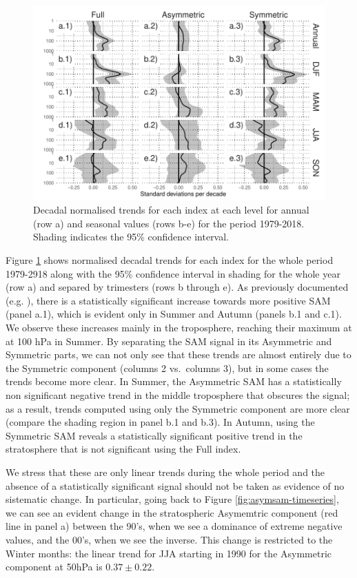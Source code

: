 \documentclass[]{ametsocV5}
\begin{document}
\begin{figure}
\includegraphics{trends-1} \caption[Decadal normalised trends for each index at each level for annual (row a) and seasonal values (rows b-e) for the period 1979-2018]{Decadal normalised trends for each index at each level for annual (row a) and seasonal values (rows b-e) for the period 1979-2018. Shading indicates the 95\% confidence interval.}\label{fig:trends}
\end{figure}

Figure \ref{fig:trends} shows normalised decadal trends for each index
for the whole period 1979-2918 along with the 95\% confidence interval
in shading for the whole year (row a) and separed by trimesters (rows b
through e). As previously documented (e.g. \citet{fogt2020}), there is a
statistically significant increase towards more positive SAM (panel
a.1), which is evident only in Summer and Autumn (panels b.1 and c.1).
We observe these increases mainly in the troposphere, reaching their
maximum at at 100 hPa in Summer. By separating the SAM signal in its
Asymmetric and Symmetric parts, we can not only see that these trends
are almost entirely due to the Symmetric component (columns 2
vs.~columns 3), but in some cases the trends become more clear. In
Summer, the Asymmetric SAM has a statistically non significant negative
trend in the middle troposphere that obscures the signal; as a result,
trends computed using only the Symmetric component are more clear
(compare the shading region in panel b.1 and b.3). In Autumn, using the
Symmetric SAM reveals a statistically significant positive trend in the
stratosphere that is not significant using the Full index.

We stress that these are only linear trends during the whole period and
the absence of a statistically significant signal should not be taken as
evidence of no sistematic change. In particular, going back to Figure
\ref{fig:asymsam-timeseries}, we can see an evident change in the
stratospheric Asymemtric component (red line in panel a) between the
90's, when we see a dominance of extreme negative values, and the 00's,
when we see the inverse. This change is restricted to the Winter months:
the linear trend for JJA starting in 1990 for the Asymmetric component
at 50hPa is \(0.37 \pm 0.22\).
\end{document}

